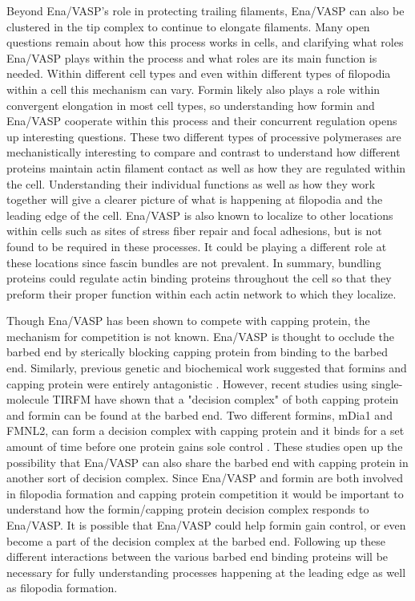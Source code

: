 Beyond Ena/VASP's role in protecting trailing filaments, Ena/VASP can also be clustered in the tip complex to continue to elongate filaments. Many open questions remain about how this process works in cells, and clarifying what roles Ena/VASP plays within the process and what roles are its main function is needed. Within different cell types and even within different types of filopodia within a cell this mechanism can vary. Formin likely also plays a role within convergent elongation in most cell types, so understanding how formin and Ena/VASP cooperate within this process and their concurrent regulation opens up interesting questions. These two different types of processive polymerases are mechanistically interesting to compare and contrast to understand how different proteins maintain actin filament contact as well as how they are regulated within the cell. Understanding their individual functions as well as how they work together will give a clearer picture of what is happening at filopodia and the leading edge of the cell. Ena/VASP is also known to localize to other locations within cells such as sites of stress fiber repair and focal adhesions, but is not found to be required in these processes. It could be playing a different role at these locations since fascin bundles are not prevalent. In summary, bundling proteins could regulate actin binding proteins throughout the cell so that they preform their proper function within each actin network to which they localize. 

Though Ena/VASP has been shown to compete with capping protein, the mechanism for competition is not known. Ena/VASP is thought to occlude the barbed end by sterically blocking capping protein from binding to the barbed end. Similarly, previous genetic and biochemical work suggested that formins and capping protein were entirely antagonistic \citep{kovar_profilin-mediated_2005}. However, recent studies using single-molecule TIRFM have shown that a "decision complex" of both capping protein and formin can be found at the barbed end. Two different formins, mDia1 and FMNL2, can form a decision complex with capping protein and it binds for a set amount of time before one protein gains sole control \citep{bombardier_single-molecule_2015,shekhar_formin_2015}. These studies open up the possibility that Ena/VASP can also share the barbed end with capping protein in another sort of decision complex. Since Ena/VASP and formin are both involved in filopodia formation and capping protein competition it would be important to understand how the formin/capping protein decision complex responds to Ena/VASP. It is possible that Ena/VASP could help formin gain control, or even become a part of the decision complex at the barbed end. Following up these different interactions between the various barbed end binding proteins will be necessary for fully understanding processes happening at the leading edge as well as filopodia formation. 

